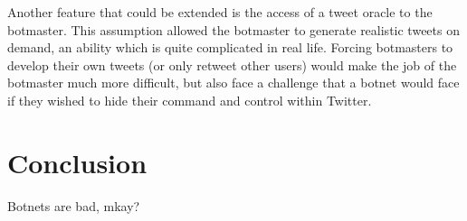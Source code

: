 \documentclass[11pt, oneside]{article} %
\numberwithin{equation}{section} %
\numberwithin{figure}{section} %
\numberwithin{table}{section} %
\begin{document}
		Another feature that could be extended is the access of a tweet oracle to the botmaster. This assumption allowed the botmaster to generate realistic tweets on demand, an ability which is quite complicated in real life. Forcing botmasters to develop their own tweets (or only retweet other users) would make the job of the botmaster much more difficult, but also face a challenge that a botnet would face if they wished to hide their command and control within Twitter.


\section{Conclusion}

        Botnets are bad, mkay?


\renewcommand\bibsection{\section{References}}
\renewcommand*{\bibfont}{\footnotesize}
\setlength\bibsep{3pt}


\end{document}
